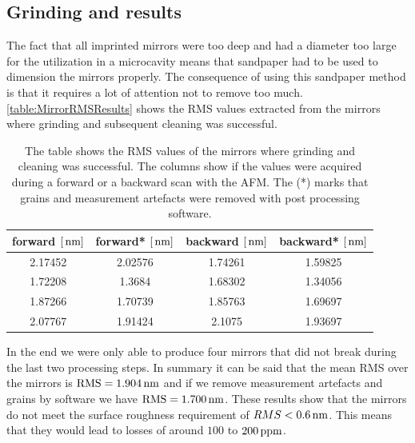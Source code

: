 \subsection{Grinding and results}
The fact that all imprinted mirrors were too deep and had a diameter too large for the utilization in a microcavity means that sandpaper had to be used to dimension the mirrors properly. The consequence of using this sandpaper method is that it requires a lot of attention not to remove too much. \autoref{table:MirrorRMSResults} shows the RMS values extracted from the mirrors where grinding and subsequent cleaning was successful.

\begin{table}[H]
	\begin{tabular}{cccc}
	\hline
	\textbf{forward $[\nm]$} & \textbf{forward* $[\nm]$} & \textbf{backward $[\nm]$} & \textbf{backward* $[\nm]$} \\
	\hline
	2.17452 & 2.02576 & 1.74261 & 1.59825 \\
	1.72208 & 1.3684 & 1.68302 & 1.34056 \\
	1.87266 & 1.70739 & 1.85763 & 1.69697 \\
	2.07767 & 1.91424 & 2.1075 & 1.93697 \\
	\hline
	\end{tabular}
	\caption{The table shows the RMS values of the mirrors where grinding and cleaning was successful. The columns show if the values were acquired during a forward or a backward scan with the AFM. The (*) marks that grains and measurement artefacts were removed with post processing software.}
	\label{table:MirrorRMSResults}
\end{table}

In the end we were only able to produce four mirrors that did not break during the last two processing steps. In summary it can be said that the mean RMS over the mirrors is $\si{RMS}=1.904\nm$ and if we remove measurement artefacts and grains by software we have $\si{RMS}=1.700\nm$. These results show that the mirrors do not meet the surface roughness requirement of $RMS<0.6\nm$. This means that they would lead to losses of around $100$ to $200\ppm$.

